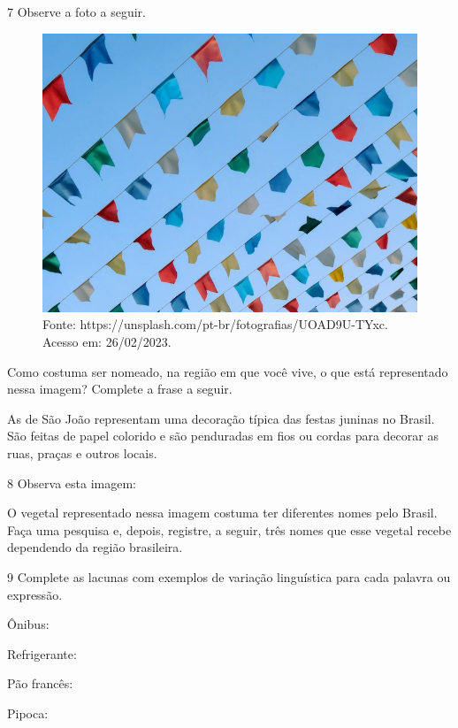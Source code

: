 

\num{7} Observe a foto a seguir.

\begin{figure}[htpb!]
\includegraphics[width=.5\textwidth]{./imgs/img19.jpg}
\caption{Fonte: https://unsplash.com/pt-br/fotografias/UOAD9U-TYxc. Acesso em: 26/02/2023.}
\end{figure}


Como costuma ser nomeado, na região em que você vive, o que está representado nessa imagem?
Complete a frase a seguir.

As \preencher \preencher \preencher de São João representam uma decoração típica das
festas juninas no Brasil. São feitas de papel colorido e são penduradas
em fios ou cordas para decorar as ruas, praças e outros locais.



\num{8} Observa esta imagem:


O vegetal representado nessa imagem costuma ter diferentes nomes pelo Brasil.
Faça uma pesquisa e, depois, registre, a seguir, três nomes que esse vegetal recebe dependendo da região brasileira.



\num{9} Complete as lacunas com exemplos de variação linguística para cada palavra ou expressão.

\begin{escolha}
\item Ônibus: 

\item Refrigerante: 

\item Pão francês:

\item Pipoca: 
\end{escolha}


